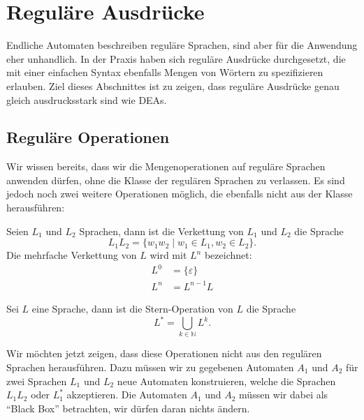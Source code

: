 \section{Reguläre Ausdrücke\label{regulaer:re}}
Endliche Automaten beschreiben reguläre Sprachen, sind aber für die
Anwendung eher unhandlich.
In der Praxis haben sich reguläre Ausdrücke
durchgesetzt, die mit einer einfachen Syntax ebenfalls Mengen von
Wörtern zu spezifizieren erlauben.
Ziel dieses Abschnittes ist
zu zeigen, dass reguläre Ausdrücke genau gleich ausdrucksstark sind
wie DEAs.

\subsection{Reguläre Operationen\label{regulaer:regulaere-operationen}}
Wir wissen bereits, dass wir die Mengenoperationen auf reguläre
Sprachen anwenden dürfen, ohne die Klasse der regulären Sprachen
zu verlassen.
Es sind jedoch noch zwei weitere Operationen möglich, die ebenfalls
nicht aus der Klasse herausführen:

\begin{definition}
Seien $L_1$ und $L_2$ Sprachen, dann ist die
Verkettung von $L_1$ und $L_2$ die Sprache
\[
L_1L_2=\{w_1w_2\;|\;w_1\in L_1,w_2\in L_2\}.
\]
Die mehrfache Verkettung von $L$ wird mit $L^n$ bezeichnet:
\begin{align*}
L^0&=\{\varepsilon\}\\
L^n&=L^{n-1}L
\end{align*}
\end{definition}

\begin{definition}
Sei $L$ eine Sprache, dann ist die Stern-Operation
von $L$ die Sprache
\[
L^*=\bigcup_{k\in\mathbb N} L^k.
\]
\end{definition}

Wir möchten jetzt zeigen, dass diese Operationen nicht aus den
regulären Sprachen herausführen.
Dazu müssen wir zu gegebenen Automaten $A_1$ und $A_2$ für zwei Sprachen
$L_1$ und $L_2$ neue Automaten konstruieren, welche
die Sprachen $L_1L_2$ oder $L_1^*$ akzeptieren.
Die Automaten $A_1$ und $A_2$ müssen wir dabei als ``Black Box'' betrachten,
wir dürfen daran nichts ändern.

